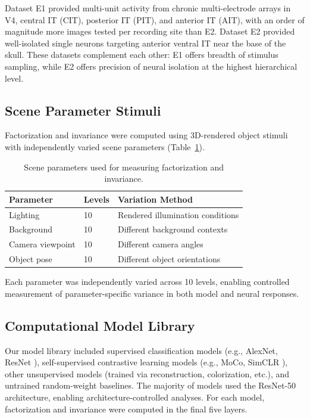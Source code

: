 \documentclass[11pt]{article}
\begin{document}
Dataset E1 provided multi-unit activity from chronic multi-electrode arrays in V4, central IT (CIT), posterior IT (PIT), and anterior IT (AIT), with an order of magnitude more images tested per recording site than E2. Dataset E2 provided well-isolated single neurons targeting anterior ventral IT near the base of the skull. These datasets complement each other: E1 offers breadth of stimulus sampling, while E2 offers precision of neural isolation at the highest hierarchical level.

\subsection{Scene Parameter Stimuli}

Factorization and invariance were computed using 3D-rendered object stimuli with independently varied scene parameters (Table~\ref{tab:params}).

\begin{table}[htbp]
\centering
\caption{Scene parameters used for measuring factorization and invariance.}
\label{tab:params}
\begin{tabular}{lll}
\toprule
Parameter & Levels & Variation Method \\
\midrule
Lighting & 10 & Rendered illumination conditions \\
Background & 10 & Different background contexts \\
Camera viewpoint & 10 & Different camera angles \\
Object pose & 10 & Different object orientations \\
\bottomrule
\end{tabular}
\end{table}

Each parameter was independently varied across 10 levels, enabling controlled measurement of parameter-specific variance in both model and neural responses.

\subsection{Computational Model Library}

Our model library included supervised classification models (e.g., AlexNet, ResNet \citep{krizhevsky2012, he2016resnet}), self-supervised contrastive learning models (e.g., MoCo, SimCLR \citep{he2020moco, chen2020simclr}), other unsupervised models (trained via reconstruction, colorization, etc.), and untrained random-weight baselines. The majority of models used the ResNet-50 architecture, enabling architecture-controlled analyses. For each model, factorization and invariance were computed in the final five layers.
\end{document}
